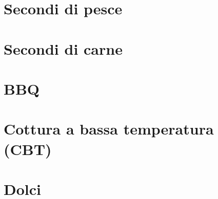 \documentclass{report}
\begin{document}
\newpage
\chapter{Secondi di pesce}




\newpage
\chapter{Secondi di carne}



\newpage
\chapter{BBQ}






\newpage
\chapter{Cottura a bassa temperatura (CBT)}



%
\newpage
\chapter{Dolci}












\end{document}
